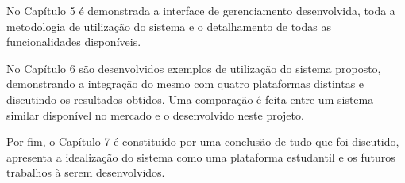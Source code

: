 No Capítulo 5 é demonstrada a interface de gerenciamento desenvolvida, toda a metodologia de utilização do sistema e o detalhamento de todas as funcionalidades disponíveis.

No Capítulo 6 são desenvolvidos exemplos de utilização do sistema proposto, demonstrando a integração do mesmo com quatro plataformas distintas e discutindo os resultados obtidos. Uma comparação é feita entre um sistema similar disponível no mercado e o desenvolvido neste projeto.

Por fim, o Capítulo 7 é constituído por uma conclusão de tudo que foi discutido, apresenta a idealização do sistema como uma plataforma estudantil e os futuros trabalhos à serem desenvolvidos.